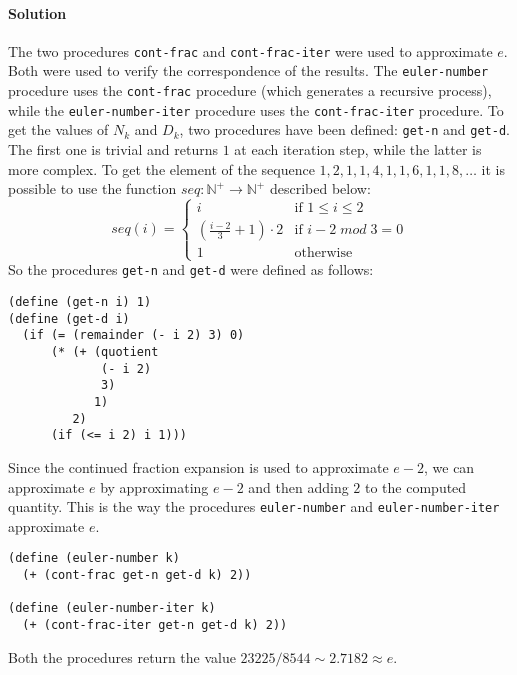 \paragraph{Solution} 
The two procedures \texttt{cont-frac} and \texttt{cont-frac-iter} were used to approximate $ e $. Both were used to verify the 
correspondence of the results.
The \texttt{euler-number} procedure uses the \texttt{cont-frac} procedure (which generates a recursive process), while the 
\texttt{euler-number-iter} procedure uses the \texttt{cont-frac-iter} procedure.
To get the values of $ N_{k} $ and $ D_{k} $, two procedures have been defined: \texttt{get-n} and \texttt{get-d}. The first one
is trivial and returns $ 1 $ at each iteration step, while the latter is more complex.
To get the element of the sequence $ 1, 2, 1, 1, 4, 1, 1, 6, 1, 1, 8, \dots $ it is possible to use the function
$ seq: \mathbb{N}^{+} \to \mathbb{N}^{+} $ described below:
\[     
  seq(i) = 
  \begin{cases}
      i & \text{if } 1 \leq i \leq 2 \\
      \left(\frac{i - 2}{3} + 1 \right) \cdot 2  & \text{if } i - 2\;mod\;3 = 0\\
      1 & \text{otherwise}
  \end{cases} 
\]
So the procedures \texttt{get-n} and \texttt{get-d} were defined as follows:
\begin{lstlisting}[caption={Definition of the procedures \texttt{get-n} and \texttt{get-d}}, captionpos=b]
(define (get-n i) 1)
(define (get-d i)
  (if (= (remainder (- i 2) 3) 0)
      (* (+ (quotient
             (- i 2)
             3)
            1)
         2)
      (if (<= i 2) i 1)))
\end{lstlisting}
Since the continued fraction expansion is used to approximate $ e - 2 $, we can approximate $ e $ by approximating $ e - 2 $ and then
adding $ 2 $ to the computed quantity. This is the way the procedures \texttt{euler-number} and \texttt{euler-number-iter}
approximate $ e $.
\begin{lstlisting}
(define (euler-number k)
  (+ (cont-frac get-n get-d k) 2))

(define (euler-number-iter k)
  (+ (cont-frac-iter get-n get-d k) 2))
\end{lstlisting}
Both the procedures return the value $ 23225 / 8544 \sim 2.7182 \approx e $.